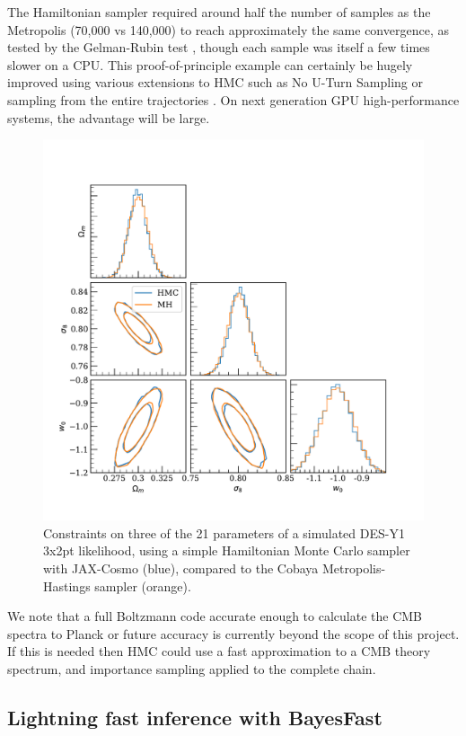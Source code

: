 \documentclass[final,5p,times,twocolumn,authoryear]{elsarticle}
\begin{document}
The Hamiltonian sampler required around half the number of samples as the Metropolis (70,000 vs 140,000) to reach approximately the same
convergence, as tested by the Gelman-Rubin test \citep{gelman}, though each sample was itself a few times slower
on a CPU.  This proof-of-principle example can certainly be hugely improved using various extensions to HMC such as No U-Turn Sampling \citep{nuts} or sampling from the entire trajectories \cite{betancourt}.  On next generation GPU high-performance systems, the advantage will be large.

\begin{figure}
\includegraphics[width=0.95\columnwidth]{figures/hmc.pdf}
\caption{Constraints on three of the 21 parameters of a simulated DES-Y1 3x2pt likelihood, using a simple Hamiltonian
Monte Carlo sampler with JAX-Cosmo (blue), compared to the Cobaya Metropolis-Hastings sampler (orange).}
\end{figure}


We note that a full Boltzmann code accurate enough to calculate the CMB spectra to Planck \citep{planck18}
or future \citep{s4,simons} accuracy is currently beyond the scope of this project.  
If this is needed then HMC could use a fast approximation to a CMB theory spectrum, and importance sampling applied to the complete chain.


\subsection{Lightning fast inference with BayesFast}
\end{document}
